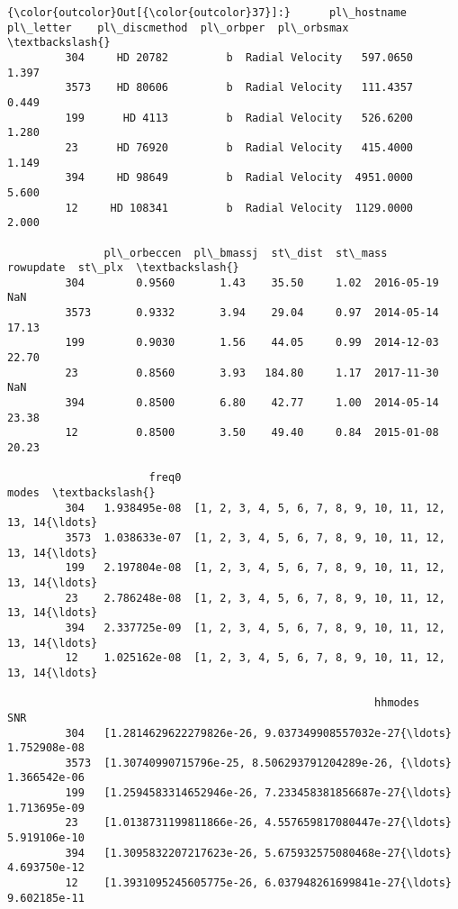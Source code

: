 \documentclass[11pt]{article}
\begin{document}
\begin{Verbatim}[commandchars=\\\{\}]
{\color{outcolor}Out[{\color{outcolor}37}]:}      pl\_hostname pl\_letter    pl\_discmethod  pl\_orbper  pl\_orbsmax  \textbackslash{}
         304     HD 20782         b  Radial Velocity   597.0650       1.397   
         3573    HD 80606         b  Radial Velocity   111.4357       0.449   
         199      HD 4113         b  Radial Velocity   526.6200       1.280   
         23      HD 76920         b  Radial Velocity   415.4000       1.149   
         394     HD 98649         b  Radial Velocity  4951.0000       5.600   
         12     HD 108341         b  Radial Velocity  1129.0000       2.000   
         
               pl\_orbeccen  pl\_bmassj  st\_dist  st\_mass   rowupdate  st\_plx  \textbackslash{}
         304        0.9560       1.43    35.50     1.02  2016-05-19     NaN   
         3573       0.9332       3.94    29.04     0.97  2014-05-14   17.13   
         199        0.9030       1.56    44.05     0.99  2014-12-03   22.70   
         23         0.8560       3.93   184.80     1.17  2017-11-30     NaN   
         394        0.8500       6.80    42.77     1.00  2014-05-14   23.38   
         12         0.8500       3.50    49.40     0.84  2015-01-08   20.23   
         
                      freq0                                              modes  \textbackslash{}
         304   1.938495e-08  [1, 2, 3, 4, 5, 6, 7, 8, 9, 10, 11, 12, 13, 14{\ldots}   
         3573  1.038633e-07  [1, 2, 3, 4, 5, 6, 7, 8, 9, 10, 11, 12, 13, 14{\ldots}   
         199   2.197804e-08  [1, 2, 3, 4, 5, 6, 7, 8, 9, 10, 11, 12, 13, 14{\ldots}   
         23    2.786248e-08  [1, 2, 3, 4, 5, 6, 7, 8, 9, 10, 11, 12, 13, 14{\ldots}   
         394   2.337725e-09  [1, 2, 3, 4, 5, 6, 7, 8, 9, 10, 11, 12, 13, 14{\ldots}   
         12    1.025162e-08  [1, 2, 3, 4, 5, 6, 7, 8, 9, 10, 11, 12, 13, 14{\ldots}   
         
                                                         hhmodes           SNR  
         304   [1.2814629622279826e-26, 9.037349908557032e-27{\ldots}  1.752908e-08  
         3573  [1.30740990715796e-25, 8.506293791204289e-26, {\ldots}  1.366542e-06  
         199   [1.2594583314652946e-26, 7.233458381856687e-27{\ldots}  1.713695e-09  
         23    [1.0138731199811866e-26, 4.557659817080447e-27{\ldots}  5.919106e-10  
         394   [1.3095832207217623e-26, 5.675932575080468e-27{\ldots}  4.693750e-12  
         12    [1.3931095245605775e-26, 6.037948261699841e-27{\ldots}  9.602185e-11  
\end{Verbatim}
            
\end{document}
